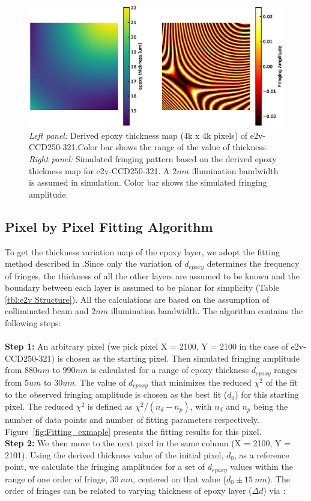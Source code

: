 \documentclass[twocolumn]{aastex63} %
\begin{document}
\begin{CJK*}{UTF8}{gbsn}
\begin{figure}[hbt]
\centering
\includegraphics[scale = 0.6]{e2v-321-map_sim.eps}
\caption{{\it Left panel:} Derived epoxy thickness map (4k x 4k pixels) of e2v-CCD250-321.Color bar shows the range of the value of thickness. {\it Right panel:} Simulated fringing pattern based on the derived epoxy thickness map for e2v-CCD250-321. A $2nm$ illumination bandwidth is assumed in simulation. Color bar shows the simulated fringing amplitude.}
\label{fig:321-map-simulation}
\end{figure}

\subsection{Pixel by Pixel Fitting Algorithm}
To get the thickness variation map of the epoxy layer, we adopt the fitting method described in \citet{Malumuth03}.Since only the variation of $d_{epoxy}$ determines the frequency of fringes, the thickness of all the other layers are assumed to be known and the boundary between each layer is assumed to be planar for simplicity (Table \ref{tbl:e2v Structure}). All the calculations are based on the assumption of colliminated beam and $2nm$ illumination bandwidth.
The algorithm contains the following steps: \\ \\
\textbf{Step 1:} An arbitrary pixel (we pick pixel X = 2100, Y = 2100 in the case of e2v-CCD250-321) is chosen as the starting pixel. Then simulated fringing amplitude from $880nm$ to $990nm$ is calculated for a range of epoxy thickness $d_{epoxy}$ ranges from $5um$ to $30um$. The value of $d_{epoxy}$ that minimizes the reduced $\chi^2$ of the fit to the observed fringing amplitude is chosen as the best fit ($d_0$) for this starting pixel. The reduced $\chi^2$ is defined as ${\chi^2}$/${(n_d-n_p)}$, with $n_d$ and $n_p$ being the number of data points and number of fitting parameters respectively. Figure~\ref{fig:Fitting_exmaple} presents the fitting results for this pixel.\\
\textbf{Step 2:} We then move to the next pixel in the same column (X = 2100, Y = 2101). Using the derived thickness value of the initial pixel, $d_0$, as a reference point, we calculate the fringing amplitudes for a set of $d_{epoxy}$ values within the range of one order of fringe, $30\ nm$, centered on that value ($d_0\pm 15\ nm$). The order of fringes can be related to varying thickness of epoxy layer ($\Delta d$) via \citep{James87}:


\end{CJK*}
\end{document}
